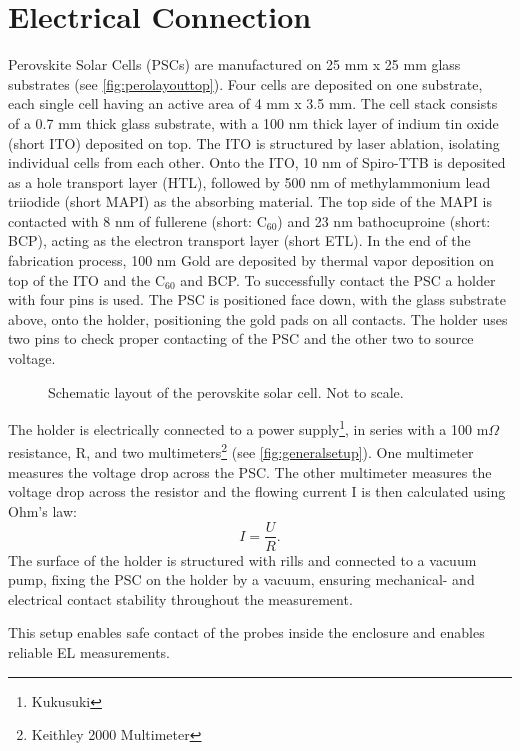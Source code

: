 \section{Electrical Connection}\label{sec:electricalconnection}
Perovskite Solar Cells (PSCs) are manufactured on 25 mm x 25 mm glass substrates (see \autoref{fig:perolayouttop}). Four cells are deposited on one substrate, each single cell having an active area of 4 mm x 3.5 mm. The cell stack consists of a 0.7 mm thick glass substrate, with a 100 nm thick layer of indium tin oxide (short ITO) deposited on top. The ITO is structured by laser ablation, isolating individual cells from each other. Onto the ITO, 10 nm of Spiro-TTB is deposited as a hole transport layer (HTL), followed by 500 nm of methylammonium lead triiodide (short MAPI) as the absorbing material. The top side of the MAPI is contacted with 8 nm of fullerene (short: C$_{60}$) and 23 nm bathocuproine (short: BCP), acting as the electron transport layer (short ETL). In the end of the fabrication process, 100 nm Gold are deposited by thermal vapor deposition on top of the ITO and the C$_{60}$ and BCP. To successfully contact the PSC a holder with four pins is used. The PSC is positioned face down, with the glass substrate above, onto the holder, positioning the gold pads on all contacts. The holder uses two pins to check proper contacting of the PSC and the other two to source voltage.
\begin{figure}
	\centering
	
	\caption{Schematic layout of the perovskite solar cell. Not to scale.}
	\label{fig:perolayouttop}
\end{figure}

The holder is electrically connected to a power supply\footnote{Kukusuki}, in series with a 100 m$\Omega$ resistance, R, and two multimeters\footnote{Keithley 2000 Multimeter} (see \autoref{fig:generalsetup}). One multimeter measures the voltage drop across the PSC. The other multimeter measures the voltage drop across the resistor and the flowing current I is then calculated using Ohm's law:
\begin{equation}
	I = \frac{U}{R}.
\end{equation}
The surface of the holder is structured with rills and connected to a vacuum pump, fixing the PSC on the holder by a vacuum, ensuring mechanical- and electrical contact stability throughout the measurement.

This setup enables safe contact of the probes inside the enclosure and enables reliable EL measurements.

